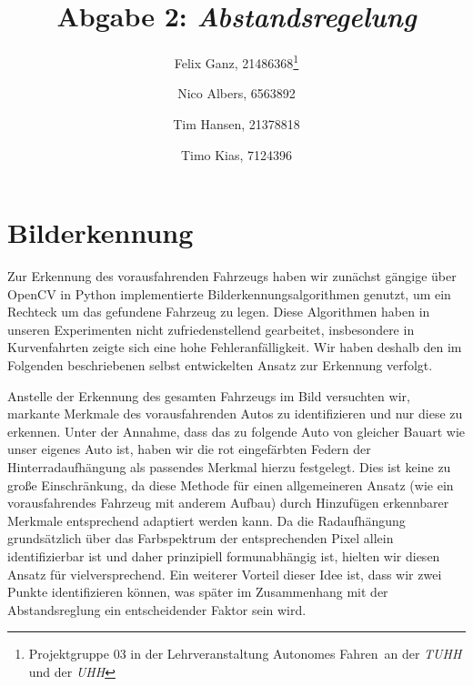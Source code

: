 \documentclass[10pt]{article}
\author{Felix Ganz, 21486368\thanks{Projektgruppe 03 in der Lehrveranstaltung \glqq{}Autonomes Fahren\grqq\ an der \emph{TUHH} und der \emph{UHH}}\and Nico Albers, 6563892\footnotemark[1] \and Tim Hansen, 21378818\footnotemark[1]\and Timo Kias, 7124396\footnotemark[1]}
\title{Abgabe 2: \emph{Abstandsregelung}}
\begin{document}
\maketitle

\section{Bilderkennung}
    Zur Erkennung des vorausfahrenden Fahrzeugs haben wir zunächst gängige über OpenCV in Python implementierte Bilderkennungsalgorithmen genutzt, um ein Rechteck um das gefundene
    Fahrzeug zu legen.
    Diese Algorithmen haben in unseren Experimenten nicht zufriedenstellend gearbeitet, insbesondere in Kurvenfahrten zeigte sich eine hohe Fehleranfälligkeit. 
    Wir haben deshalb den im Folgenden beschriebenen selbst entwickelten Ansatz zur Erkennung verfolgt.

    Anstelle der Erkennung des gesamten Fahrzeugs im Bild versuchten wir, markante Merkmale des vorausfahrenden Autos zu identifizieren und nur diese zu erkennen.
    Unter der Annahme, dass das zu folgende Auto von gleicher Bauart wie unser eigenes Auto ist, haben wir die rot eingefärbten Federn der Hinterradaufhängung als passendes Merkmal hierzu festgelegt.
    Dies ist keine zu große Einschränkung, da diese Methode für einen allgemeineren Ansatz (wie ein vorausfahrendes Fahrzeug mit anderem Aufbau) durch Hinzufügen erkennbarer Merkmale entsprechend adaptiert werden kann.
    Da die Radaufhängung grundsätzlich über das Farbspektrum der entsprechenden Pixel allein identifizierbar ist und daher prinzipiell formunabhängig ist, hielten wir diesen Ansatz für vielversprechend.
    Ein weiterer Vorteil dieser Idee ist, dass wir zwei Punkte identifizieren können, was später im Zusammenhang mit der Abstandsreglung ein entscheidender Faktor sein wird.
\end{document}
